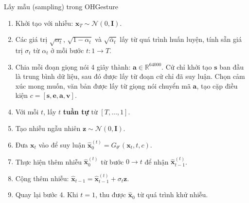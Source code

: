 \begin{algorithm}
	\caption{Lấy mẫu (sampling) trong OHGesture}
	\label{alg:sampling}
	\setlength{\baselineskip}{10pt}
	\begin{enumerate}
		\item Khởi tạo với nhiễu: $\mathbf{x}_T \sim \mathcal{N}(0, \mathbf{I})$.
		
		\item Các giá trị $\sqrt{\alpha_t}$, $\sqrt{1 - \alpha_t}$ và $\sqrt{\bar{\alpha}_t}$ lấy từ quá trình huấn luyện, tính sẵn giá trị $\sigma_t$ từ $\alpha_t$ ở mỗi bước $t: 1 \rightarrow T$.
		
		\item Chia mỗi đoạn giọng nói 4 giây thành: $\mathbf{a} \in \mathbb{R}^{64000}$. Cử chỉ khởi tạo $\mathbf{s}$ ban đầu là trung bình dữ liệu, sau đó được lấy từ đoạn cử chỉ đã suy luận. Chọn cảm xúc mong muốn, văn bản được lấy từ giọng nói chuyển mã $\mathbf{a}$, tạo cặp điều kiện $c = [\mathbf{s}, \mathbf{e}, \mathbf{a}, \mathbf{v}]$.
		
		\item Với mỗi $t$, lấy $t$ \textbf{tuần tự} từ $[T, \dots, 1]$.
		
		\item Tạo nhiễu ngẫu nhiên $\mathbf{z} \sim \mathcal{N}(0, \mathbf{I})$.
		
		\item Đưa $\mathbf{x}_t$ vào để suy luận $\hat{\mathbf{x}}_0^{(t)} = G_{\theta'}(\mathbf{x}_t, t, c)$.
		
		\item Thực hiện thêm nhiễu $\hat{\mathbf{x}}_0^{(t)}$ từ bước $0 \rightarrow t$ để nhận $\hat{\mathbf{x}}_{t-1}^{(t)}$.
		
		\item Cộng thêm nhiễu: $\hat{\mathbf{x}}_{t-1} = \hat{\mathbf{x}}_{t-1}^{(t)} + \sigma_t \mathbf{z}$.
		
		\item Quay lại bước 4. Khi $t = 1$, thu được $\hat{\mathbf{x}}_0$ từ quá trình khử nhiễu.
	\end{enumerate}

\end{algorithm}

